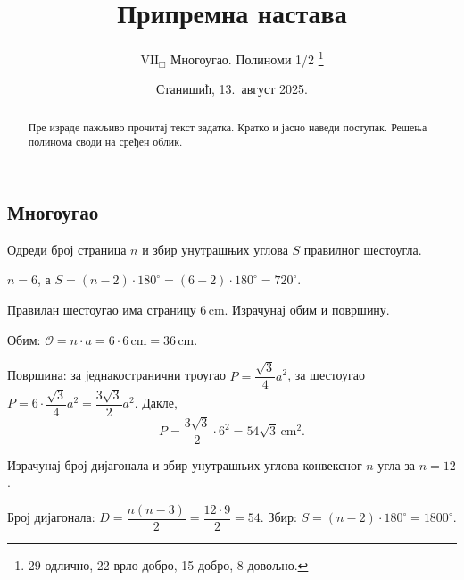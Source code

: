 \documentclass[12pt,a5paper,twoside,addpoints,noanswers]{exam} %
\title{Припремна настава}
\author{$\mathrm{VII}_\Box$ Многоугао. Полиноми 1/2
 \thanks{
  29 одлично,
  22 врло добро,
  15 добро,
   8 довољно.
 }
}
\date{Станишић, 13.\ август 2025.}
\newcommand{\measure}[2]{#1\,\mathrm{#2}}
\newcommand{\variant}[3]{#1}
\begin{document}
\maketitle
\thispagestyle{headandfoot}

\ifprintanswers\else
\begin{flushleft}\scriptsize
\gradetable[h]
\end{flushleft}
\fi

\begin{abstract}
Пре израде пажљиво прочитај текст задатка. Кратко и јасно наведи поступак. Решења полинома своди на сређен облик.
\end{abstract}

\begin{questions}

\section*{Многоугао}

\question[3]
Одреди број страница $n$ и збир унутрашњих углова $S$ правилног
\variant{шестоугла}{осмоугла}{десетоугла}.
\begin{solution}[\stretch 1]
$n=\variant{6}{8}{10}$, а $S=(n-2)\cdot 180^\circ
= (\variant{6}{8}{10}-2)\cdot 180^\circ
= \variant{720^\circ}{1080^\circ}{1440^\circ}$.
\end{solution}

\question[3]
Правилан \variant{шестоугао}{троугао}{шестоугао} има страницу
$\measure{\variant{6}{12}{4}}{cm}$.
Израчунај обим и површину.
\begin{solution}[\stretch 3]
Обим: $\mathcal{O}=n\cdot a=\variant{6}{3}{6}\cdot
\measure{\variant{6}{12}{4}}{cm}
= \measure{\variant{36}{36}{24}}{cm}$.

Површина: за једнакостранични троугао $P=\dfrac{\sqrt{3}}{4}a^2$,
за шестоугао $P=6\cdot\dfrac{\sqrt{3}}{4}a^2=\dfrac{3\sqrt{3}}{2}a^2$.
Дакле,
\[
P=\variant{
\dfrac{3\sqrt{3}}{2}\cdot 6^2
= 54\sqrt{3}\,\mathrm{cm}^2
}{
\dfrac{\sqrt{3}}{4}\cdot 12^2
= 36\sqrt{3}\,\mathrm{cm}^2
}{
\dfrac{3\sqrt{3}}{2}\cdot 4^2
= 24\sqrt{3}\,\mathrm{cm}^2
}.
\]
\end{solution}

\ifprintanswers\else\newpage\fi

\question[3]
Израчунај број дијагонала и збир унутрашњих углова конвексног
$n$-угла за \(n=\variant{12}{15}{10}\).
\begin{solution}[\stretch 2]
Број дијагонала: $D=\dfrac{n(n-3)}{2}
=\variant{\dfrac{12\cdot 9}{2}=54}{\dfrac{15\cdot 12}{2}=90}{\dfrac{10\cdot 7}{2}=35}$.
Збир: $S=(n-2)\cdot 180^\circ
=\variant{1800^\circ}{2340^\circ}{1440^\circ}$.
\end{solution}


\end{questions}
\end{document}
